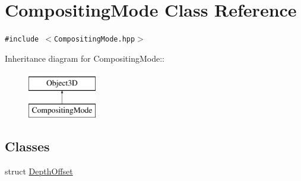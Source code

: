 \hypertarget{classm3g_1_1CompositingMode}{
\section{CompositingMode Class Reference}
\label{classm3g_1_1CompositingMode}
}
{\tt \#include $<$CompositingMode.hpp$>$}

Inheritance diagram for CompositingMode::\begin{figure}[H]
\begin{center}
\leavevmode
\includegraphics[height=2cm]{classm3g_1_1CompositingMode}
\end{center}
\end{figure}
\subsection*{Classes}
\begin{CompactItemize}
\item 
struct \hyperlink{structm3g_1_1CompositingMode_1_1DepthOffset}{DepthOffset}
\end{CompactItemize}
